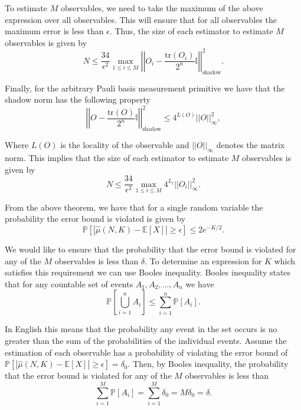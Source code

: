 \documentclass[12pt]{article}
\begin{document}
    To estimate $M$ observables, we need to take the maximum of the above expression over all observables. This will ensure that for all observables the maximum error is less than $\epsilon$. Thus, the size of each estimator to estimate $M$ observables is given by
    \begin{equation}
        N \leq \frac{34}{\epsilon^2} \max_{1\leq i \leq M} \left|\left| O_i - \frac{\text{tr}(O_i)}{2^n} \mathbb{I} \right|\right|^2_\text{shadow}.
    \end{equation}

    Finally, for the arbitrary Pauli basis measurement primitive we have that the shadow norm has the following property
    \begin{equation}
        \left|\left| O - \frac{\text{tr}(O)}{2^n} \mathbb{I} \right|\right|^2_\text{shadow} \leq 4^{L(O)} ||O||^2_\infty,
    \end{equation}

    Where $L(O)$ is the locality of the observable and $||O||_\infty$ denotes the matrix norm. This implies that the size of each estimator to estimate $M$ observables is given by
    \begin{equation}
        N \leq \frac{34}{\epsilon^2} \max_{1\leq i \leq M} 4^{L_i} ||O_i||^2_\infty.
    \end{equation}

    From the above theorem, we have that for a single random variable the probability the error bound is violated is given by
    \begin{equation}
        \mathbb{P}[|\hat{\mu}(N, K) - \mathbb{E}[X]| \geq \epsilon] \leq 2e^{-K/2}.
    \end{equation}

    We would like to ensure that the probability that the error bound is violated for any of the $M$ observables is less than $\delta$. To determine an expression for $K$ which satisfies this requirement we can use Booles inequality. Booles inequality states that for any countable set of events $A_1, A_2, \ldots, A_n$ we have
    \begin{equation}
        \mathbb{P}\left[\bigcup_{i=1}^n A_i\right] \leq \sum_{i=1}^n \mathbb{P}[A_i].
    \end{equation}

    In English this means that the probability any event in the set occurs is no greater than the sum of the probabilities of the individual events. Assume the estimation of each observable has a probability of violating the error bound of $\mathbb{P}[|\hat{\mu}(N, K) - \mathbb{E}[X]| \geq \epsilon] = \delta_0$. Then, by Booles inequality, the probability that the error bound is violated for any of the $M$ observables is less than
    \begin{equation*}
        \sum_{i=1}^M \mathbb{P}[A_i] = \sum_{i=1}^M \delta_0 = M\delta_0 = \delta.
    \end{equation*}
\end{document}
